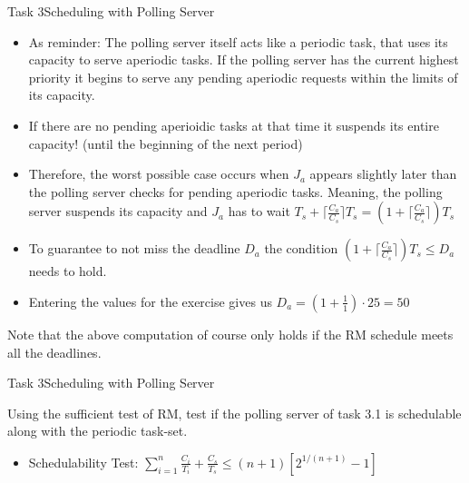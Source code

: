 \begin{frame}[allowframebreaks]{Task 3}{Scheduling with Polling Server}
    \begin{solutionnoinc}
      \begin{itemize}
          \item As reminder: The polling server itself acts like a \alert{periodic} task, that uses its capacity to serve \alert{aperiodic} tasks. If the polling server has the current highest priority it begins to serve any pending aperiodic requests within the limits of its capacity.
          \item If there are no pending aperioidic tasks at that time it \alert{suspends} its entire capacity! (until the beginning of the next period)
          \item Therefore, the worst possible case occurs when $J_a$ appears slightly later than the polling server checks for pending aperiodic tasks. Meaning, the polling server suspends its capacity and $J_a$ has to wait $T_s + \lceil \frac{C_a}{C_s}\rceil T_s = (1 + \lceil \frac{C_a}{C_s}\rceil)T_s$
      \end{itemize}
    \end{solutionnoinc}
    \framebreak
    \begin{solution}
      \begin{itemize}
          \item To guarantee to not miss the deadline $D_a$ the condition $(1 + \lceil \frac{C_a}{C_s}\rceil)T_s \leq D_a$ needs to hold.
          \item Entering the values for the exercise gives us $D_a = (1 + \frac{1}{1})\cdot 25 = 50$
      \end{itemize}
    \end{solution}
    \begin{Sidenote}
      Note that the above computation of course only holds if the RM schedule meets all the deadlines.
    \end{Sidenote}
\end{frame}
\begin{frame}{Task 3}{Scheduling with Polling Server}
    \begin{tasknoinc}
    Using the sufficient test of RM, test if the polling server of task 3.1 is schedulable along with the periodic task-set.
    \end{tasknoinc}
    \begin{requirementsnoinc}
      \begin{itemize}
        \item \alert{Schedulability Test:} $\displaystyle\sum_{i=1}^n \frac{C_i}{T_i}+\frac{C_s}{T_s}\leq(n+1)\left[2^{1 /(n+1)}-1\right]$
      \end{itemize}
    \end{requirementsnoinc}
\end{frame}
